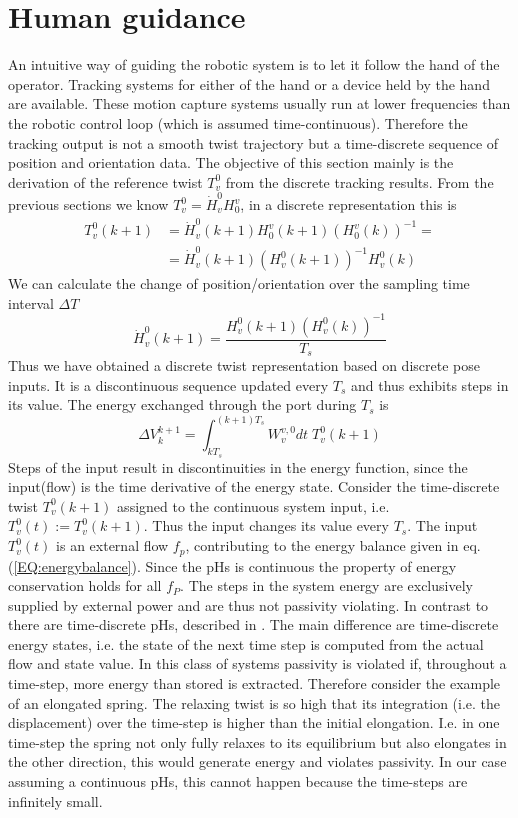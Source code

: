 \documentclass[a4paper,twoside, openright,12pt]{report}
\begin{document}
\section{Human guidance}
An intuitive way of guiding the robotic system is to let it follow the hand of the operator. Tracking systems for either of the hand or a device held by the hand are available. These motion capture systems usually run at lower frequencies than the robotic control loop (which is assumed time-continuous). Therefore the tracking output is not a smooth twist trajectory but a time-discrete sequence of position and orientation data. The objective of this section mainly is the derivation of the reference twist $T_v^0$ from the discrete tracking results.   
From the previous sections we know $T_v^0 = \dot{H}_v^0 H_0^v$, in a discrete representation this is
\begin{equation}
\begin{aligned}
T_v^0 (k+1) &= \dot{H}_v^0(k+1) H_0^v(k+1)(H_0^v(k))^{-1} = \\ &=\dot{H}_v^0(k+1)(H_v^0(k+1))^{-1} H_v^0(k)
\end{aligned}
\end{equation}  We can calculate the change of position/orientation over the sampling time interval $\Delta T$
\begin{equation}
\dot{H}_v^0 (k+1) = \frac{H_v^0 (k+1) (H_v^0(k))^{-1}  }{T_s}
\end{equation}
Thus we have obtained a discrete twist representation based on discrete pose inputs. It is a discontinuous sequence updated every $T_s$ and thus exhibits steps in its value. The energy exchanged through the port during $T_s$ is
\begin{equation}
\Delta V_k^{k+1} =  \int_{kT_s}^{(k+1)T_s}W_v^{v,0}dt \; T_v^0(k+1)
\end{equation}  
Steps of the input result in discontinuities in the energy function, since the input(flow) is the time derivative of the energy state. Consider the time-discrete twist $T_v^0(k+1)$ assigned to the continuous system input, i.e. $T_v^0(t) := T_v^0(k+1)$. Thus the input changes its value every $T_s$. The input $T_v^0(t)$ is an external flow $f_p$, contributing to the energy balance given in eq. (\ref{EQ:energybalance}). Since the pHs is continuous the property of energy conservation holds for all $f_P$. The steps in the system energy are exclusively supplied by external power and are thus not passivity violating.
In contrast to there are time-discrete pHs, described in \cite{Stramigioli_05}. The main difference are time-discrete energy states, i.e. the state of the next time step is computed from the actual flow and state value. In this class of systems passivity is violated if, throughout a time-step, more energy than stored is extracted. Therefore consider the example of an elongated spring. The relaxing twist is so high that its integration (i.e. the displacement) over the time-step is higher than the initial elongation. I.e. in one time-step the spring not only fully relaxes to its equilibrium but also elongates in the other direction, this would generate energy and violates passivity. In our case assuming a continuous pHs, this cannot happen because the time-steps are infinitely small.\\
\end{document}
